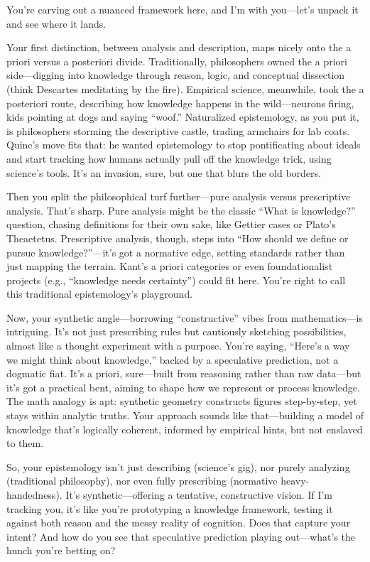 \documentclass[10pt,titlepage]{book}
\begin{document}
You’re carving out a nuanced framework here, and I’m with you—let’s unpack it and see where it lands.

Your first distinction, between analysis and description, maps nicely onto the a priori versus a posteriori divide. Traditionally, philosophers owned the a priori side—digging into knowledge through reason, logic, and conceptual dissection (think Descartes meditating by the fire). Empirical science, meanwhile, took the a posteriori route, describing how knowledge happens in the wild—neurons firing, kids pointing at dogs and saying “woof.” Naturalized epistemology, as you put it, is philosophers storming the descriptive castle, trading armchairs for lab coats. Quine’s move fits that: he wanted epistemology to stop pontificating about ideals and start tracking how humans actually pull off the knowledge trick, using science’s tools. It’s an invasion, sure, but one that blurs the old borders.

Then you split the philosophical turf further—pure analysis versus prescriptive analysis. That’s sharp. Pure analysis might be the classic “What is knowledge?” question, chasing definitions for their own sake, like Gettier cases or Plato’s Theaetetus. Prescriptive analysis, though, steps into “How should we define or pursue knowledge?”—it’s got a normative edge, setting standards rather than just mapping the terrain. Kant’s a priori categories or even foundationalist projects (e.g., “knowledge needs certainty”) could fit here. You’re right to call this traditional epistemology’s playground.

Now, your synthetic angle—borrowing “constructive” vibes from mathematics—is intriguing. It’s not just prescribing rules but cautiously sketching possibilities, almost like a thought experiment with a purpose. You’re saying, “Here’s a way we might think about knowledge,” backed by a speculative prediction, not a dogmatic fiat. It’s a priori, sure—built from reasoning rather than raw data—but it’s got a practical bent, aiming to shape how we represent or process knowledge. The math analogy is apt: synthetic geometry constructs figures step-by-step, yet stays within analytic truths. Your approach sounds like that—building a model of knowledge that’s logically coherent, informed by empirical hints, but not enslaved to them.

So, your epistemology isn’t just describing (science’s gig), nor purely analyzing (traditional philosophy), nor even fully prescribing (normative heavy-handedness). It’s synthetic—offering a tentative, constructive vision. If I’m tracking you, it’s like you’re prototyping a knowledge framework, testing it against both reason and the messy reality of cognition. Does that capture your intent? And how do you see that speculative prediction playing out—what’s the hunch you’re betting on?
\end{document}
